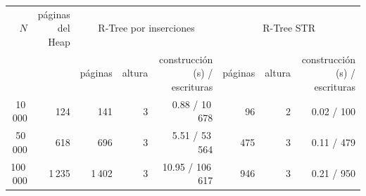 \begin{tabular}{@{}rrrrrrrr@{}}
\toprule
$N$ & páginas del Heap & \multicolumn{3}{c}{R-Tree por inserciones} & \multicolumn{3}{c}{R-Tree STR} \\
\cmidrule(lr){3-5}\cmidrule(l){6-8}
 & & páginas & altura & construcción (s) / escrituras & páginas & altura & construcción (s) / escrituras \\
\midrule
10\,000 & 124 & 141 & 3 & 0.88 / 10\,678 & 96 & 2 & 0.02 / 100 \\
50\,000 & 618 & 696 & 3 & 5.51 / 53\,564 & 475 & 3 & 0.11 / 479 \\
100\,000 & 1\,235 & 1\,402 & 3 & 10.95 / 106\,617 & 946 & 3 & 0.21 / 950 \\
\bottomrule
\end{tabular}
